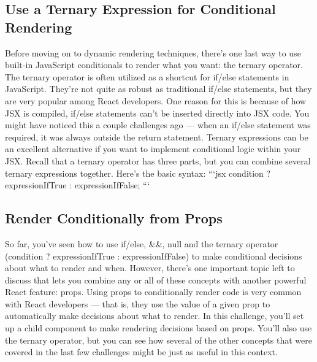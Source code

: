 \documentclass{article}%
\begin{document}
%
\subsection{Use a Ternary Expression for Conditional Rendering}%
\label{subsec:UseaTernaryExpressionforConditionalRendering}%
Before moving on to dynamic rendering techniques, there's one last way to use built{-}in JavaScript conditionals to render what you want: the ternary operator. The ternary operator is often utilized as a shortcut for if/else statements in JavaScript. They're not quite as robust as traditional if/else statements, but they are very popular among React developers. One reason for this is because of how JSX is compiled, if/else statements can't be inserted directly into JSX code. You might have noticed this a couple challenges ago — when an if/else statement was required, it was always outside the return statement. Ternary expressions can be an excellent alternative if you want to implement conditional logic within your JSX. Recall that a ternary operator has three parts, but you can combine several ternary expressions together. Here's the basic syntax:\newline%
```jsx\newline%
condition ? expressionIfTrue : expressionIfFalse;\newline%
```\newline%

%
\subsection{Render Conditionally from Props}%
\label{subsec:RenderConditionallyfromProps}%
So far, you've seen how to use if/else, \&\&, null and the ternary operator (condition ? expressionIfTrue : expressionIfFalse) to make conditional decisions about what to render and when. However, there's one important topic left to discuss that lets you combine any or all of these concepts with another powerful React feature: props. Using props to conditionally render code is very common with React developers — that is, they use the value of a given prop to automatically make decisions about what to render.\newline%
In this challenge, you'll set up a child component to make rendering decisions based on props. You'll also use the ternary operator, but you can see how several of the other concepts that were covered in the last few challenges might be just as useful in this context.\newline%
\end{document}
